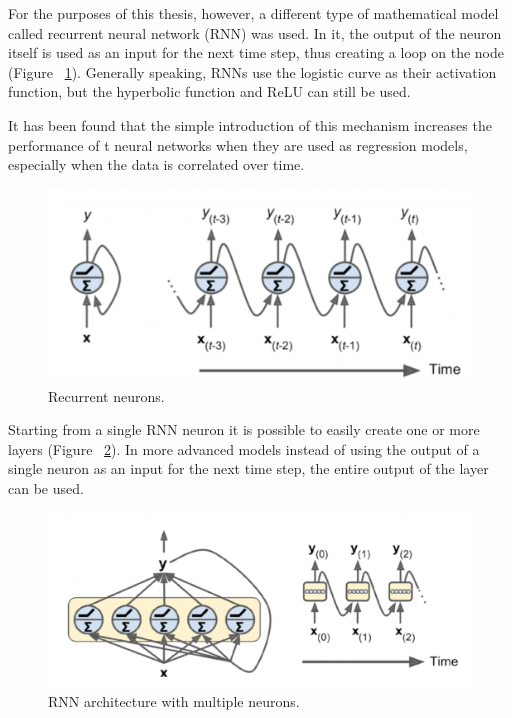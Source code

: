 For the purposes of this thesis, however, a different type of mathematical model called recurrent neural network (RNN) was used. In it, the output of the neuron itself is used as an input for the next time step, thus creating a loop on the node (Figure ~\ref{fig:Recurrent_neurons}).
Generally speaking, RNNs use the logistic curve as their activation function, but the hyperbolic function and ReLU can still be used.

It has been found that the simple introduction of this mechanism increases the performance of t neural networks when they are used as regression models, especially when the data is correlated over time. 

\begin{figure} [h]
    \centering
    \includegraphics[width=\textwidth,height=\textheight,keepaspectratio]{Images/Theory_and_method/unnamed-6.png}
    \caption{Recurrent neurons.}
    \label{fig:Recurrent_neurons}
\end{figure}

Starting from a single RNN neuron it is possible to easily create one or more layers (Figure ~\ref{fig:RNN_multi_layer}). In more advanced models instead of using the output of a single neuron as an input for the next time step, the entire output of the layer can be used.

\begin{figure} [h]
    \centering
    \includegraphics[width=\textwidth,height=\textheight,keepaspectratio]{Images/Theory_and_method/unnamed-7.png}
    \caption{RNN architecture with multiple neurons.}
    \label{fig:RNN_multi_layer}
\end{figure}

